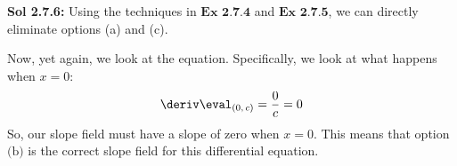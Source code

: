 \begin{tcolorbox}[example]
\begin{oneparchoices}
    \end{oneparchoices}
\end{tcolorbox}
\begin{tcolorbox}[solution]
    \textbf{Sol 2.7.6:} Using the techniques in $\textbf{Ex 2.7.4}$ and $\textbf{Ex 2.7.5}$, we can directly eliminate options (a) and (c). \par
    \vspace{11pt}
    Now, yet again, we look at the equation. Specifically, we look at what happens when $x = 0$: \begin{align*}
        \deriv \eval_{(0, \, c)} = \dfrac{0}{c} = 0
    \end{align*}
    So, our slope field must have a slope of zero when $x = 0$. This means that option $\boxed{\text{(b)}}$ is the correct slope field for this differential equation.
\end{tcolorbox} 

